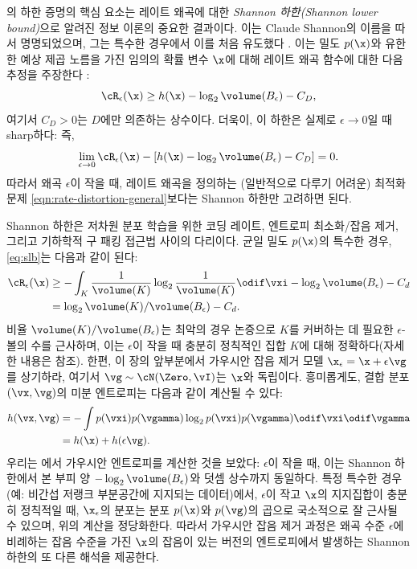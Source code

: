 \documentclass[../../book-main_ko.tex]{subfiles}
\begin{document}
\begin{remark}\label{rem:slb}
	의 하한 증명의 핵심 요소는 레이트 왜곡에 대한 \textit{Shannon 하한(Shannon lower bound)}으로 알려진 정보 이론의 중요한 결과이다. 이는 Claude Shannon의 이름을 따서 명명되었으며, 그는 특수한 경우에서 이를 처음 유도했다 \cite{shannon1959coding}. 이는 밀도 $p(\x)$와 유한한 예상 제곱 노름을 가진 임의의 확률 변수 $\x$에 대해 레이트 왜곡 함수에 대한 다음 추정을 주장한다 \cite{Linder1994-ej}:
	\begin{equation}\label{eq:slb}
		\cR_{\epsilon}(\x)
		\geq
		h(\x)
		- \log_2 \volume(B_{\epsilon})
		-
		C_D,
	\end{equation}
	여기서 $C_D > 0$는 $D$에만 의존하는 상수이다. 더욱이, 이 하한은 실제로 $\epsilon \to 0$일 때 sharp하다: 즉,
	\begin{equation}
		\lim_{\epsilon \to 0} \cR_{\epsilon}(\x) - \left[ h(\x) - \log_2
		\volume(B_{\epsilon}) - C_D\right] = 0.
	\end{equation}
	따라서 왜곡 $\epsilon$이 작을 때, 레이트 왜곡을 정의하는 (일반적으로 다루기 어려운) 최적화 문제 \eqref{eqn:rate-distortion-general}보다는 Shannon 하한만 고려하면 된다.

	Shannon 하한은 저차원 분포 학습을 위한 코딩 레이트, 엔트로피 최소화/잡음 제거, 그리고 기하학적 구 패킹 접근법 사이의 다리이다. 균일 밀도 $p(\x)$의 특수한 경우, \eqref{eq:slb}는 다음과 같이 된다:
	\begin{align}
		\cR_{\epsilon}(\x) &\geq -\int_K \frac{1}{\volume(K)} \log_2
		\frac{1}{\volume(K)} \odif \vxi
		- \log_2 \volume(B_{\epsilon}) - C_d
		\\
		&=
		\log_2 \volume(K) / \volume(B_{\epsilon})
		- C_d. \label{eq:shannon-lower-bound-uniform}
	\end{align}
	비율 $\volume(K) / \volume(B_{\epsilon})$는 최악의 경우 논증으로 $K$를 커버하는 데 필요한 $\epsilon$-볼의 수를 근사하며, 이는 $\epsilon$이 작을 때 충분히 정칙적인 집합 $K$에 대해 정확하다(자세한 내용은  참조).
	한편, 이 장의 앞부분에서 가우시안 잡음 제거 모델 $\x_{\epsilon} = \x + \epsilon \vg$를 상기하라, 여기서 $\vg \sim \cN(\Zero, \vI)$는 $\x$와 독립이다.
	흥미롭게도, 결합 분포 $(\vx, \vg)$의 미분 엔트로피는 다음과 같이 계산될 수 있다:
	\begin{align}
		h(\vx, \vg)
		&=
		-\int
		p(\vxi) p(\vgamma) \log_2 p(\vxi) p(\vgamma) \odif \vxi \odif \vgamma
		\\
		&=
		h(\x) + h(\epsilon \vg).
	\end{align}
	우리는 에서 가우시안 엔트로피를 계산한 것을 보았다: $\epsilon$이 작을 때, 이는 Shannon 하한에서 본 부피 양 $-\log_2 \volume(B_{\epsilon})$와 덧셈 상수까지 동일하다.
	특정 특수한 경우(예: 비간섭 저랭크 부분공간에 지지되는 데이터)에서, $\epsilon$이 작고 $\x$의 지지집합이 충분히 정칙적일 때, $\x_{\epsilon}$의 분포는 분포 $p(\x)$와 $p(\vg)$의 곱으로 국소적으로 잘 근사될 수 있으며, 위의 계산을 정당화한다.
	따라서 가우시안 잡음 제거 과정은 왜곡 수준 $\epsilon$에 비례하는 잡음 수준을 가진 $\x$의 잡음이 있는 버전의 엔트로피에서 발생하는 Shannon 하한의 또 다른 해석을 제공한다.


\end{remark}
\end{document}
